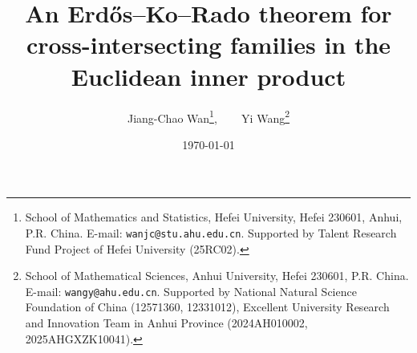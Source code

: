 \documentclass[11pt]{article}
\numberwithin{equation}{section}
\begin{document}
\title{An Erd\H{o}s--Ko--Rado theorem for cross-intersecting families in the Euclidean inner product}

\author{
Jiang-Chao Wan\footnote{School of Mathematics and Statistics, Hefei University, Hefei 230601, Anhui, P.R. China.
E-mail: \texttt{wanjc@stu.ahu.edu.cn}. Supported by Talent Research Fund Project of Hefei University (25RC02).}, ~~~
Yi Wang\footnote{School of Mathematical Sciences,
Anhui University, Hefei 230601, P.R. China.
E-mail: \texttt{wangy@ahu.edu.cn}.
Supported by National Natural Science Foundation of China (12571360, 12331012),
Excellent University Research and Innovation Team in Anhui Province (2024AH010002, 2025AHGXZK10041).}
}











\date{\today}%


\maketitle
\end{document}
